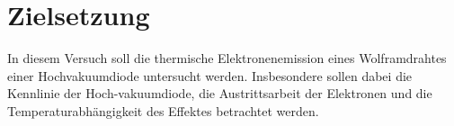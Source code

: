 \section{Zielsetzung}
\label{sec:Zielsetzung}
In diesem Versuch soll die thermische Elektronenemission eines Wolframdrahtes einer Hochvakuumdiode untersucht werden. 
Insbesondere sollen dabei die Kennlinie der Hoch-vakuumdiode, die Austrittsarbeit der Elektronen und die Temperaturabhängigkeit des Effektes betrachtet werden.